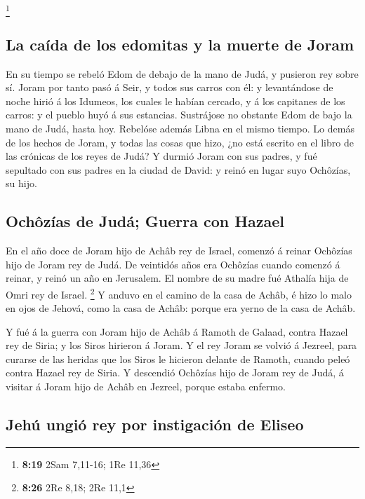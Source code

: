 \footnote{\textbf{8:19} 2Sam 7,11-16; 1Re 11,36}

\hypertarget{la-cauxedda-de-los-edomitas-y-la-muerte-de-joram}{%
\subsection{La caída de los edomitas y la muerte de
Joram}\label{la-cauxedda-de-los-edomitas-y-la-muerte-de-joram}}

 En su tiempo se rebeló Edom de debajo de la mano de Judá,
y pusieron rey sobre sí.  Joram por tanto pasó á Seir, y
todos sus carros con él: y levantándose de noche hirió á los Idumeos,
los cuales le habían cercado, y á los capitanes de los carros: y el
pueblo huyó á sus estancias.  Sustrájose no obstante Edom
de bajo la mano de Judá, hasta hoy. Rebelóse además Libna en el mismo
tiempo.  Lo demás de los hechos de Joram, y todas las cosas
que hizo, ¿no está escrito en el libro de las crónicas de los reyes de
Judá?  Y durmió Joram con sus padres, y fué sepultado con
sus padres en la ciudad de David: y reinó en lugar suyo Ochôzías, su
hijo.

\hypertarget{ochuxf4zuxedas-de-juduxe1-guerra-con-hazael}{%
\subsection{Ochôzías de Judá; Guerra con
Hazael}\label{ochuxf4zuxedas-de-juduxe1-guerra-con-hazael}}

 En el año doce de Joram hijo de Achâb rey de Israel,
comenzó á reinar Ochôzías hijo de Joram rey de Judá.  De
veintidós años era Ochôzías cuando comenzó á reinar, y reinó un año en
Jerusalem. El nombre de su madre fué Athalía hija de Omri rey de Israel.
\footnote{\textbf{8:26} 2Re 8,18; 2Re 11,1}  Y anduvo en el
camino de la casa de Achâb, é hizo lo malo en ojos de Jehová, como la
casa de Achâb: porque era yerno de la casa de Achâb.

 Y fué á la guerra con Joram hijo de Achâb á Ramoth de
Galaad, contra Hazael rey de Siria; y los Siros hirieron á Joram.
 Y el rey Joram se volvió á Jezreel, para curarse de las
heridas que los Siros le hicieron delante de Ramoth, cuando peleó contra
Hazael rey de Siria. Y descendió Ochôzías hijo de Joram rey de Judá, á
visitar á Joram hijo de Achâb en Jezreel, porque estaba enfermo.

\hypertarget{jehuxfa-ungiuxf3-rey-por-instigaciuxf3n-de-eliseo}{%
\subsection{Jehú ungió rey por instigación de
Eliseo}\label{jehuxfa-ungiuxf3-rey-por-instigaciuxf3n-de-eliseo}}

